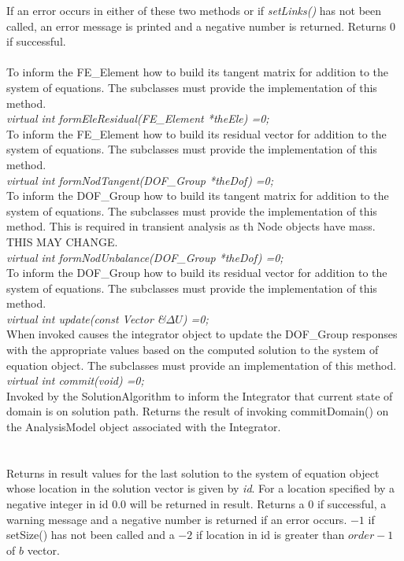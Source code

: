 \noindent If an error occurs in either of these two methods or if {\em
setLinks()} has not been called, an error message is printed and a
negative number is returned. Returns $0$ if successful. \\ 


 \\
To inform the FE\_Element how to build its tangent matrix for addition
to the system of equations. The subclasses must provide the
implementation of this method. \\

{\em virtual int formEleResidual(FE\_Element *theEle) =0;} \\
To inform the FE\_Element how to build its residual vector for addition
to the system of equations. The subclasses must provide the
implementation of this method. \\

{\em virtual int formNodTangent(DOF\_Group *theDof) =0;} \\
To inform the DOF\_Group how to build its tangent matrix for addition
to the system of equations. The subclasses must provide the
implementation of this method. This is required in transient analysis
as th Node objects have mass. THIS MAY CHANGE.\\

{\em virtual int formNodUnbalance(DOF\_Group *theDof) =0;} \\
To inform the DOF\_Group how to build its residual vector for addition
to the system of equations. The subclasses must provide the
implementation of this method. \\

{\em virtual int update(const Vector \&$\Delta U$) =0;} \\
When invoked causes the integrator object to update the DOF\_Group
responses with the appropriate values based on the computed solution
to the system of equation object. The subclasses must provide an
implementation of this method. \\

{\em virtual int commit(void) =0;} \\
Invoked by the SolutionAlgorithm to inform the Integrator that current
state of domain is on solution path. Returns the result of invoking
commitDomain() on the AnalysisModel object associated with the
Integrator. \\


\\
 \\
Returns in \p result values for the last solution to the system of
equation object whose location in the solution vector is given by {\em
id}. For a location specified by a negative integer in \p id 0.0 will be
returned in \p result. Returns a $0$ if successful, a warning
message and a negative number is returned if an error occurs. $-1$ if
setSize() has not been called and a $-2$ if location in \p id is
greater than $order-1$ of $b$ vector.\\


